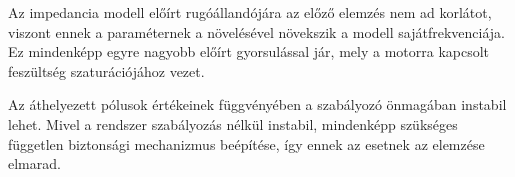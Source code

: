 Az impedancia modell előírt rugóállandójára az előző elemzés nem ad korlátot, viszont 
ennek a paraméternek a növelésével növekszik a modell sajátfrekvenciája. Ez mindenképp 
egyre nagyobb előírt gyorsulással jár, mely a motorra kapcsolt feszültség szaturációjához vezet.

Az áthelyezett pólusok értékeinek függvényében a szabályozó önmagában instabil lehet. Mivel a rendszer szabályozás 
nélkül instabil, mindenképp szükséges független biztonsági mechanizmus beépítése, így ennek az esetnek az elemzése elmarad. 
